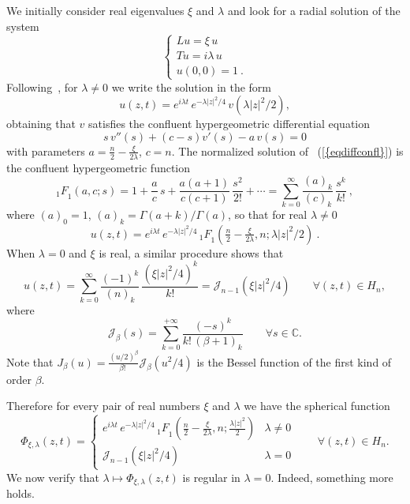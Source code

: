 \documentclass[12pt,a4paper]{amsart}
\theoremstyle{plain}
\theoremstyle{definition}
\numberwithin{equation}{section}
\begin{document}
We initially consider real eigenvalues $\xi$ and ${\lambda}$ and look for a radial solution of the system
\begin{equation}\label{sistema}
\left\{
\begin{array}{l}
Lu=\xi\, u
\\
Tu=i{\lambda}\, u
\\
u(0,0)=1\ .
\end{array}
\right.
\end{equation}
Following~\cite{Kora}, for ${\lambda}\neq 0$  we write the solution in the form 
$$
u(z,t)=e^{i{\lambda} t}\,e^{-{\lambda} |z|^2/4}\,v({\lambda} |z|^2/2),
$$
obtaining that $v$ satisfies
the confluent hypergeometric  differential equation
\begin{equation}\label{eqdiffconfl}
s\,v''(s)+(c-s)v'(s)-a\,v(s)=0
\end{equation}
with parameters $a=\frac{n}{2}-\frac{\xi}{2{\lambda}}$, $c={n}$.
The normalized solution of {~(\ref{{eqdiffconfl}})} is the confluent hypergeometric function
$$
{ {_{1} F}_{\!1}}(a,c;s)=1+\frac{a}{c}\, s+\frac{a(a+1)}{c(c+1)}\, \frac{s^2}{2!}+\cdots
=\sum_{k=0}^\infty \frac{(a)_k}{(c)_k}\, \frac{s^k}{k!}\ ,
$$
where $(a)_0=1$, $(a)_k=\Gamma(a+k)/\Gamma(a)$,
so that for real ${\lambda}\neq 0$
$$
u(z,t)=e^{i{\lambda} t}\,e^{-{\lambda} |z|^2/4}\,
{ {_{1} F}_{\!1}}(\tfrac{n}{2}-\tfrac{\xi}{2{\lambda}},{n};{\lambda} |z|^2/2)\ .
$$
When ${\lambda}=0$  and $\xi$ is real,
a similar procedure shows that 
$$
u 
(z,t)=\sum_{k=0}^\infty \frac{(-1)^k}{({n})_k}\,
\frac{(\xi |z|^2/4)^k}{k!}={\mathcal J}_{{n}-1}(\xi |z|^2/4)
\qquad\forall (z,t)\in {{H_{n}}},
$$
where 
$$
{\mathcal J}_{\beta}(s) 
= 
\sum_{k=0}^{+\infty}
\frac{(-s)^k }{k!\,(\beta+1)_k}
\qquad \forall s\in {\mathbb C}.
$$
Note that $J_{\beta}(u)=\displaystyle\frac{(u /2)^{\beta }}{\beta!\,\,}  
{\mathcal J}_{\beta}\left(u^2 /4\right)$
  is the   Bessel function of the first kind of order $\beta$.
  
  Therefore for every pair of  real 
numbers $\xi$ and ${\lambda}$ we have the spherical function
\begin{equation*} 
  \Phi_{\xi,{\lambda}}(z,t)=
\begin{cases}
 e^{i{\lambda} t}\, e^{-{\lambda} |z|^2/4}\, 
{ {_{1} F}_{\!1}} \left(\frac{n}{2} -\frac{\xi}{2 {\lambda}},{n};\frac{{\lambda} |z|^2}{2}\right) 
&  
{\lambda}\not= 0
\\
{\mathcal J}_{{n}-1}(\xi |z|^2/4)&    
{\lambda} = 0
\end{cases}
\qquad \forall (z,t)\in {{H_{n}}}.
\end{equation*}
 We now verify
  that  ${\lambda}\longmapsto  \Phi_{\xi,{\lambda}}(z,t)$ is regular in ${\lambda}=0$.
Indeed, something more holds.
 
\end{document}
